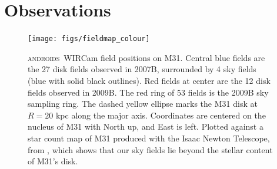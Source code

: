 \documentclass[iop]{emulateapj}
\newcommand{\androids}{\textsc{androids}}
\begin{document}
\section{Observations}
\label{sec:Observations}

\begin{figure}[t]
\centering
\texttt{[image: figs/fieldmap\_colour]}
\caption{\androids\ WIRCam field positions on M31.
Central blue fields are the 27 disk fields observed in 2007B, surrounded by 4 sky fields (blue with solid black outlines).
Red fields at center are the 12 disk fields observed in 2009B.
The red ring of 53 fields is the 2009B sky sampling ring.
The dashed yellow ellipse marks the M31 disk at $R=20$ kpc along the major axis.
Coordinates are centered on the nucleus of M31 with North up, and East is left.
Plotted against a star count map of M31 produced with the Isaac Newton Telescope, from \cite{Ibata:2005}, which shows that our sky fields lie beyond the stellar content of M31's disk.}
\label{fig:fieldmap}
\end{figure}

\end{document}
